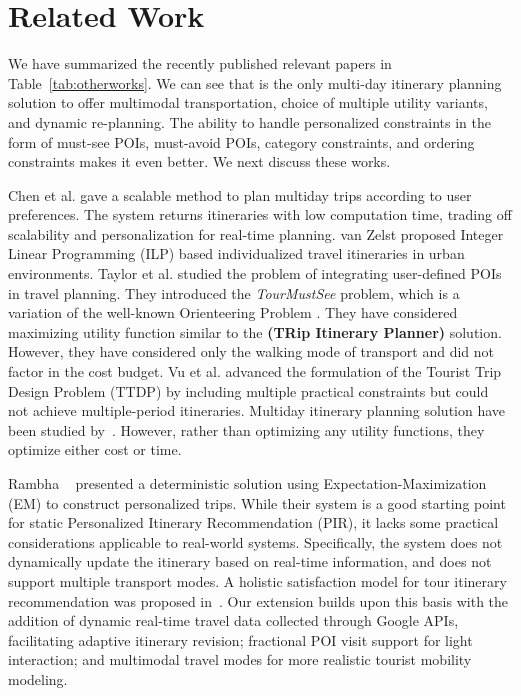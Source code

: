 \section{Related Work}
\label{Rel_Work}

We have summarized the recently published relevant papers in Table~\ref{tab:otherworks}. We can see that \trip is the only multi-day itinerary planning solution to offer multimodal transportation, choice of multiple utility variants, and dynamic re-planning. The ability to handle personalized constraints in the form of must-see POIs, must-avoid POIs, category constraints, and ordering constraints makes it even better. We next discuss these works.
 
Chen et al. \cite{chen2014automatic} gave a scalable method to plan multiday trips according to user preferences. The system returns itineraries with low computation time, trading off scalability and personalization for real-time planning. van Zelst \cite{vanzelst2016itinerary} proposed Integer Linear Programming (ILP) based individualized travel itineraries in urban environments. Taylor et al. \cite{taylor2018tour} studied the problem of integrating user-defined POIs in travel planning. They introduced the \emph{TourMustSee} problem, which is a variation of the well-known Orienteering Problem \cite{golden1987orienteering}. They have considered maximizing utility function similar to the \textbf{\trip (TRip Itinerary Planner)} solution. However, they have considered only the walking mode of transport and did not factor in the cost budget. Vu et al. \cite{vu2022branch} advanced the formulation of the Tourist Trip Design Problem (TTDP) by including multiple practical constraints but could not achieve multiple-period itineraries. Multiday itinerary planning solution have been studied by~\cite{chen2014automatic, vanzelst2016itinerary, liu2024personalized, rambha2024optimized}. However, rather than optimizing any utility functions, they optimize either cost or time.  

Rambha ~\cite{panagiotakis2024expectation} presented a deterministic solution using Expectation-Maximization (EM) to construct personalized trips. While their system is a good starting point for static Personalized Itinerary Recommendation (PIR), it lacks some practical considerations applicable to real-world systems. Specifically, the system does not dynamically update the itinerary based on real-time information, and does not support multiple transport modes. A holistic satisfaction model for tour itinerary recommendation was proposed in~\cite{liu2024personalized}. Our extension builds upon this basis with the addition of dynamic real-time travel data collected through Google APIs, facilitating adaptive itinerary revision; fractional POI visit support for light interaction; and multimodal travel modes for more realistic tourist mobility modeling. 

